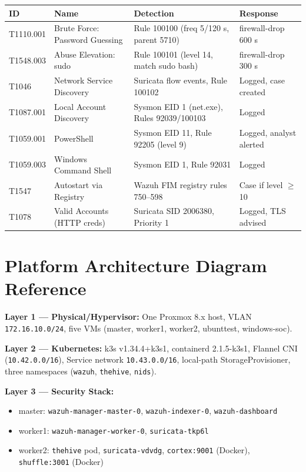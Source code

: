 \documentclass[12pt,a4paper]{report}
\begin{document}
\begin{longtable}{p{2.2cm}p{3cm}p{4.5cm}p{3.5cm}}
\toprule
\textbf{ID} & \textbf{Name} & \textbf{Detection} & \textbf{Response} \\
\midrule
\endhead
T1110.001 & Brute Force: Password Guessing & Rule 100100 (freq 5/120 s, parent 5710) & firewall-drop 600 s \\
T1548.003 & Abuse Elevation: sudo          & Rule 100101 (level 14, match sudo bash) & firewall-drop 300 s \\
T1046     & Network Service Discovery      & Suricata flow events, Rule 100102       & Logged, case created \\
T1087.001 & Local Account Discovery        & Sysmon EID 1 (net.exe), Rules 92039/100103 & Logged \\
T1059.001 & PowerShell                     & Sysmon EID 11, Rule 92205 (level 9)    & Logged, analyst alerted \\
T1059.003 & Windows Command Shell          & Sysmon EID 1, Rule 92031               & Logged \\
T1547     & Autostart via Registry         & Wazuh FIM registry rules 750--598      & Case if level $\geq$ 10 \\
T1078     & Valid Accounts (HTTP creds)    & Suricata SID 2006380, Priority 1       & Logged, TLS advised \\
\bottomrule
\end{longtable}

\chapter{Platform Architecture Diagram Reference}
\label{app:arch}

\textbf{Layer 1 --- Physical/Hypervisor:} One Proxmox 8.x host, VLAN \texttt{172.16.10.0/24}, five VMs (master, worker1, worker2, ubunttest, windows-soc).

\textbf{Layer 2 --- Kubernetes:} k3s v1.34.4+k3s1, containerd 2.1.5-k3s1, Flannel CNI (\texttt{10.42.0.0/16}), Service network \texttt{10.43.0.0/16}, local-path StorageProvisioner, three namespaces (\texttt{wazuh}, \texttt{thehive}, \texttt{nids}).

\textbf{Layer 3 --- Security Stack:}
\begin{itemize}
  \item master: \texttt{wazuh-manager-master-0}, \texttt{wazuh-indexer-0}, \texttt{wazuh-dashboard}
  \item worker1: \texttt{wazuh-manager-worker-0}, \texttt{suricata-tkp6l}
  \item worker2: \texttt{thehive} pod, \texttt{suricata-vdvdg}, \texttt{cortex:9001} (Docker), \texttt{shuffle:3001} (Docker)
\end{itemize}
\end{document}
